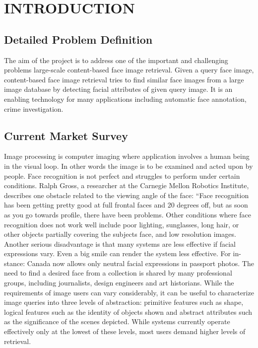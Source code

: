 \chapter{INTRODUCTION}
\lfoot{
\footnotesize{\textcolor{gray}{Topic Name}}}
\rfoot{\small{\thepage}}




\section{\normalsize{\textbf{Detailed Problem Definition}}}
The aim of the project is to address one of the important and challenging problems large-scale content-based face image retrieval. Given a query face image, content-based face image retrieval tries to find similar face images from a large image database by detecting facial attributes of given query image. It is an enabling technology for many applications including automatic face annotation, crime investigation.

\section{\normalsize{\textbf{Current Market Survey}}}
Image processing is computer imaging where application involves a human being in the visual loop. In other words the image is to be examined and acted upon by people. Face recognition is not perfect and struggles to perform under certain conditions. Ralph Gross, a researcher at the Carnegie Mellon Robotics Institute, describes one obstacle related to the viewing angle of the face: “Face recognition has been getting pretty good at full frontal faces and 20 degrees off, but as soon as you go towards profile, there have been problems. Other conditions where face recognition does not work well include poor lighting, sunglasses, long hair, or other objects partially covering the subjects face, and low resolution images. Another serious disadvantage is that many systems are less effective if facial expressions vary. Even a big smile can render the system less effective. For in- stance: Canada now allows only neutral facial expressions in passport photos. The need to find a desired face from a collection is shared by many professional groups, including journalists, design engineers and art historians. While the requirements of image users can vary considerably, it can be useful to characterize image queries into three levels of abstraction: primitive features such as shape, logical features such as the identity of objects shown and abstract attributes such as the significance of the scenes depicted. While systems currently operate effectively only at the lowest of these levels, most users demand higher levels of retrieval.

